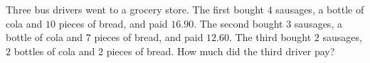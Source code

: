 Three bus drivers went to a grocery store. The first bought $4$ sausages, a bottle of cola and $10$ pieces of bread, and paid $16.90$. The second bought $3$ sausages, a bottle of cola and $7$ pieces of bread, and paid $12.60$. The third bought $2$ sausages, $2$ bottles of cola and $2$ pieces of bread. How much did the third driver pay?
